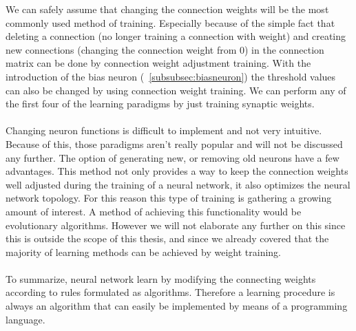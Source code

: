 \documentclass[pdftex,a4paper,12pt,twoside]{report}
\theoremstyle{plain} \newtheorem{theorem}{Theorem} \newtheorem{proposition}{Proposition} \newtheorem{lemma}{Lemma} \newtheorem*{corollary}{Corollary}
\theoremstyle{definition} \newtheorem{definition}{Definition} \newtheorem{conjecture}{Conjecture} \newtheorem*{example}{Example} \newtheorem{algorithm}{Algorithm}
\theoremstyle{remark} \newtheorem*{remark}{Remark} \newtheorem*{note}{Note} \newtheorem{case}{Case}
\begin{document}
We can safely assume that changing the connection weights will be the most commonly used method of training. Especially because of the simple fact that deleting a connection (no longer training a connection with weight) and creating new connections (changing the connection weight from 0) in the connection matrix can be done by connection weight adjustment training. With the introduction of the bias neuron (~\ref{subsubsec:biasneuron}) the threshold values can also be changed by using connection weight training.  We can perform any of the first four of the learning paradigms by just training synaptic weights.\\\\Changing neuron functions is difficult to implement and not very intuitive. Because of this, those paradigms aren't really popular and will not be discussed any further. The option of generating new, or removing old neurons have a few advantages. This method not only provides a way to keep the connection weights well adjusted during the training of a neural network, it also optimizes the neural network topology. For this reason this type of training is gathering a growing amount of interest. A method of achieving this functionality would be evolutionary algorithms. However we will not elaborate any further on this since this is outside the scope of this thesis, and since we already covered that the majority of learning methods can be achieved by weight training.\\\\To summarize, neural network learn by modifying the connecting weights according to rules formulated as algorithms. Therefore a learning procedure is always an algorithm that can easily be implemented by means of a programming language.
\end{document}

